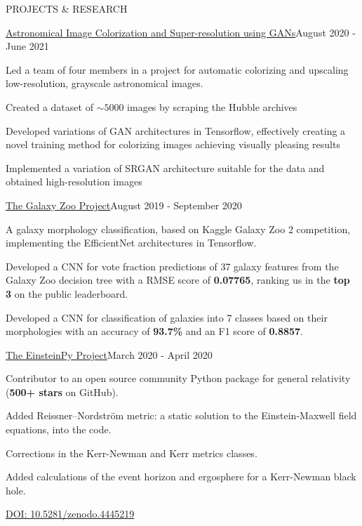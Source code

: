 \documentclass{resume} %
\begin{document}
\begin{rSection}{PROJECTS \& RESEARCH}

\begin{rSubsection}{\href{https://github.com/obi-wan-shinobi/Astronomical-Image-Colorization}{Astronomical Image Colorization and Super-resolution using GANs}}{August 2020 - June 2021}{}{}
\vspace{-0.9em}
\item Led a team of four members in a project for automatic colorizing and upscaling low-resolution, grayscale astronomical images.
\item Created a dataset of $\sim 5000$ images by scraping the Hubble archives
\item Developed variations of GAN architectures in Tensorflow, effectively creating a novel training method for colorizing images achieving visually pleasing results
\item Implemented a variation of SRGAN architecture suitable for the data and obtained high-resolution images
\end{rSubsection}

\begin{rSubsection}{\href{https://github.com/obi-wan-shinobi/GalaxyEfficientNets}{The Galaxy Zoo Project}}{August 2019 - September 2020}{}{}
\vspace{-0.9em}
\item A galaxy morphology classification, based on Kaggle Galaxy Zoo 2 competition, implementing the EfficientNet architectures in Tensorflow.
\item Developed a CNN for vote fraction predictions of 37 galaxy features from the Galaxy Zoo decision tree with a RMSE score of \textbf{0.07765}, ranking us in the \textbf{top 3} on the public leaderboard.
\item Developed a CNN for classification of galaxies into 7 classes based on their morphologies with an accuracy of \textbf{93.7\%} and an F1 score of \textbf{0.8857}.
\end{rSubsection}

\begin{rSubsection}{\href{https://github.com/einsteinpy/einsteinpy}{The EinsteinPy Project}}{March 2020 - April 2020}{}{}
\vspace{-0.9em}
\item Contributor to an open source community Python package for general relativity (\textbf{500+ stars} on GitHub).
\item Added Reissner–Nordström metric: a static solution to the Einstein-Maxwell field equations, into the code.
\item Corrections in the Kerr-Newman and Kerr metrics classes.
\item Added calculations of the event horizon and ergosphere for a Kerr-Newman black hole.
\item \href{https://doi.org/10.5281/zenodo.4445219
}{DOI: 10.5281/zenodo.4445219}
\end{rSubsection}


\end{rSection}
\end{document}
